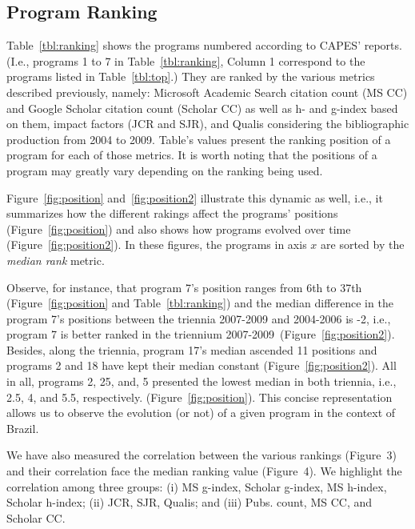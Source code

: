 \documentclass[10pt]{article}
\begin{document}
\subsection*{Program Ranking}
\label{sec:rp}

Table~\ref{tbl:ranking} shows the programs numbered according to CAPES' reports. (I.e., programs 1 to 7 in Table~\ref{tbl:ranking}, Column 1 correspond to the
programs listed in Table~\ref{tbl:top}.)
They are ranked by the various metrics described 
previously,
 namely: Microsoft Academic Search citation
count (MS CC) and Google Scholar citation count (Scholar CC) as well as h- and g-index based on them, impact factors (JCR and
SJR), and Qualis considering the bibliographic production from 2004 to 2009. Table's values present the ranking position of a
program for each of those metrics. 
It is worth noting that the positions of a
program may greatly vary depending on the ranking being used.

Figure~\ref{fig:position} and~\ref{fig:position2}  illustrate this dynamic as well, i.e., it summarizes how the different rakings affect the
programs' positions (Figure~\ref{fig:position}) and also shows how programs evolved over time
(Figure~\ref{fig:position2}).
In these figures, the programs in axis $x$ are sorted by the 
\textit{median rank} metric.

Observe, for instance, that
 program 7's position ranges from 6th to 37th (Figure~\ref{fig:position} and Table~\ref{tbl:ranking}) and the median difference in the program 7's positions between the triennia 2007-2009 and 2004-2006 is -2, i.e., program 7 is better ranked in the triennium 2007-2009~(Figure~\ref{fig:position2}). Besides, along the triennia, program 17's median ascended 11 positions and programs 2 and 18 have kept their median constant (Figure~\ref{fig:position2}). All in all, programs 2, 25, and, 5 presented the lowest median in both triennia, i.e., 2.5, 4, and 5.5, respectively. (Figure~\ref{fig:position}).
This concise representation allows us to observe the evolution (or not) of a given program in the context of Brazil.

We have also measured the correlation between the various rankings
(Figure~3) and their correlation face the median ranking value
(Figure~4). We highlight  the correlation among three groups:
(i) MS g-index, Scholar g-index, MS h-index, Scholar h-index; (ii) JCR, SJR, Qualis; and
(iii) Pubs. count, MS CC, and Scholar CC.
\end{document}
